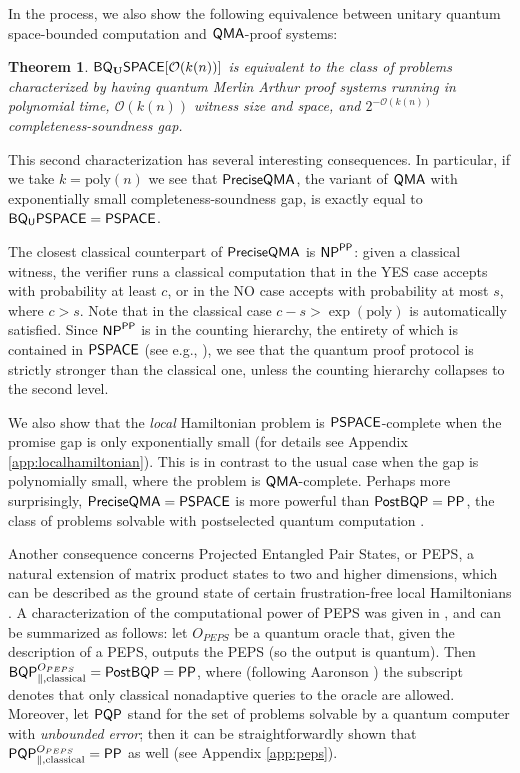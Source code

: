 \documentclass[11pt]{article}
\newtheorem{theorem}{Theorem}
\theoremstyle{definition}
\theoremstyle{remark}
\newcommand\QMA{{\sf{QMA}}}
\newcommand\PSPACE{{\sf{PSPACE}}}
\newcommand\BQPSPACE{{\sf{BQ_{U}PSPACE}}}
\newcommand\PP{\sf{PP}}
\newcommand\NP{{\sf{NP}}}
\newcommand\BQP{{\sf{BQP}}}
\newcommand\PostBQP{{\sf{PostBQP}}}
\newcommand\PQP{{\sf{PQP}}}
\newcommand\QMAexp{{\sf{PreciseQMA}}}
\newcommand{\classfont}{\sf}
\newcommand{\Unitary}{\mathbf{U}}
\newcommand{\unitaryBQSPACE}[1]{{\classfont{BQ}_\Unitary\classfont{SPACE}}[#1]}
\newcommand{\poly}{\textrm{poly}}
\begin{document}
In the process, we also show the following equivalence between unitary quantum space-bounded computation and $\QMA$-proof systems:
\begin{theorem}
$\unitaryBQSPACE{\mathcal{O}(k(n))}$ is equivalent to the class of problems characterized by having quantum Merlin Arthur proof systems running in polynomial time, $\mathcal{O}(k(n))$ witness size and space, and $2^{-\mathcal{O}(k(n))}$ completeness-soundness gap.
\end{theorem}

This second characterization has several interesting consequences.  In particular, if we take $k = \poly(n)$ we see that $\QMAexp$, the variant of $\QMA$ with exponentially small completeness-soundness gap, is exactly equal to $\BQPSPACE=\PSPACE$.  

The closest classical counterpart of $\QMAexp$ is $\NP^{\PP}$: given a classical witness, the verifier runs a classical computation that in the YES case accepts with probability at least $c$, or in the NO case accepts with probability at most $s$, where $c>s$. Note that in the classical case $c - s > \exp(\poly)$ is automatically satisfied. Since $\NP^{\PP}$ is in the counting hierarchy, the entirety of which is contained in $\PSPACE$ (see e.g., \cite{allenderwagner}), we see that the quantum proof protocol is strictly stronger than the classical one, unless the counting hierarchy collapses to the second level.

We also show that the \emph{local} Hamiltonian problem is $\PSPACE$-complete when the promise gap is only exponentially small (for details see Appendix \ref{app:localhamiltonian}). This is in contrast to the usual case when the gap is polynomially small, where the problem is $\QMA$-complete. Perhaps more surprisingly, $\QMAexp = \PSPACE$ is more powerful than $\PostBQP=\PP$, the class of problems solvable with postselected quantum computation \cite{aaronson05}.

Another consequence concerns Projected Entangled Pair States, or PEPS, a natural extension of matrix product states to two and higher dimensions, which can be described as the ground state of certain frustration-free local Hamiltonians \cite{vc04}. A characterization of the computational power of PEPS was given in \cite{swv07}, and can be summarized as follows: let $O_{PEPS}$ be a quantum oracle that, given the description of a PEPS, outputs the PEPS (so the output is quantum). Then $\BQP^{O_{PEPS}}_{\parallel,\text{classical}} = \PostBQP = \PP$, where (following Aaronson \cite{aaronson05}) the subscript  denotes that only classical nonadaptive queries to the oracle are allowed. Moreover, let $\PQP$ stand for the set of problems solvable by a quantum computer with \emph{unbounded error}; then it can be straightforwardly shown that $\PQP^{O_{PEPS}}_{\parallel,\text{classical}} = \PP$ as well (see Appendix \ref{app:peps}).
\end{document}
